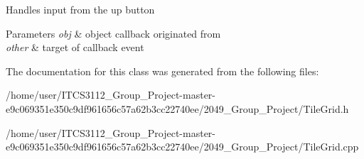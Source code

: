 Handles input from the up button


\begin{DoxyParams}{Parameters}
{\em obj} & object callback originated from \\
\hline
{\em other} & target of callback event \\
\hline
\end{DoxyParams}


The documentation for this class was generated from the following files\+:\begin{DoxyCompactItemize}
\item 
/home/user/\+I\+T\+C\+S3112\+\_\+\+Group\+\_\+\+Project-\/master-\/e9c069351e350c9df961656c57a62b3cc22740ee/2049\+\_\+\+Group\+\_\+\+Project/Tile\+Grid.\+h\item 
/home/user/\+I\+T\+C\+S3112\+\_\+\+Group\+\_\+\+Project-\/master-\/e9c069351e350c9df961656c57a62b3cc22740ee/2049\+\_\+\+Group\+\_\+\+Project/Tile\+Grid.\+cpp\end{DoxyCompactItemize}
